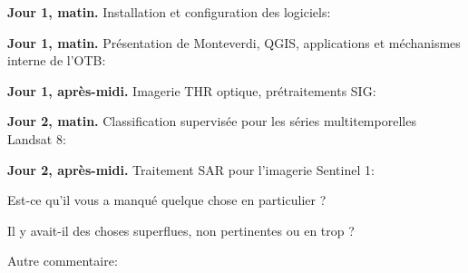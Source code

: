 \documentclass[10pt,a4paper]{article}
\begin{document}
\textbf{Jour 1, matin.} Installation et configuration des logiciels:
\moduleanswer

\textbf{Jour 1, matin.} Présentation de Monteverdi, QGIS, applications et méchanismes interne de l'OTB:
\moduleanswer

\textbf{Jour 1, après-midi.} Imagerie THR optique, prétraitements SIG:
\moduleanswer

\textbf{Jour 2, matin.} Classification supervisée pour les séries multitemporelles Landsat 8:
\moduleanswer

\textbf{Jour 2, après-midi.} Traitement SAR pour l'imagerie Sentinel 1:
\moduleanswer

Est-ce qu'il vous a manqué quelque chose en particulier ?
\vspace{6em}

Il y avait-il des choses superflues, non pertinentes ou en trop ?
\vspace{6em}

Autre commentaire:
\end{document}

